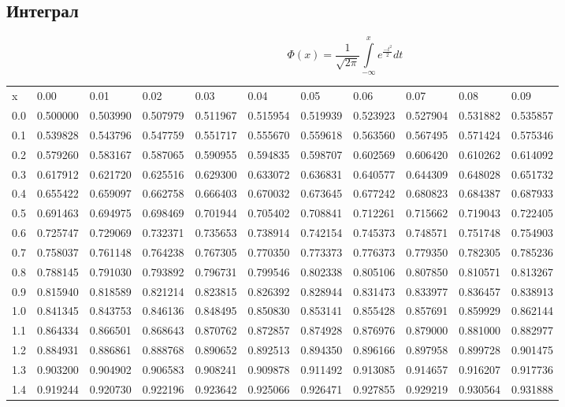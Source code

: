 \documentclass[12pt, a6paper]{extarticle}
\begin{document}
\subsection{Интеграл}
\begin{center}
$$ \Phi(x) = \frac{1}{\sqrt{2\pi}}\int\limits^{x}_{-\infty}{\displaystyle e^{\frac{-t^2}{2}}}dt$$
\footnotesize
\begin{tabular}{lllllllllll}
 x & 0.00&    0.01&    0.02&    0.03&    0.04&    0.05&    0.06&    0.07&    0.08&    0.09 \\
0.0& 0.500000&0.503990&0.507979&0.511967&0.515954&0.519939&0.523923&0.527904&0.531882&0.535857 \\
0.1& 0.539828&0.543796&0.547759&0.551717&0.555670&0.559618&0.563560&0.567495&0.571424&0.575346 \\
0.2& 0.579260&0.583167&0.587065&0.590955&0.594835&0.598707&0.602569&0.606420&0.610262&0.614092 \\
0.3& 0.617912&0.621720&0.625516&0.629300&0.633072&0.636831&0.640577&0.644309&0.648028&0.651732 \\
0.4& 0.655422&0.659097&0.662758&0.666403&0.670032&0.673645&0.677242&0.680823&0.684387&0.687933 \\
0.5& 0.691463&0.694975&0.698469&0.701944&0.705402&0.708841&0.712261&0.715662&0.719043&0.722405 \\
0.6& 0.725747&0.729069&0.732371&0.735653&0.738914&0.742154&0.745373&0.748571&0.751748&0.754903 \\
0.7& 0.758037&0.761148&0.764238&0.767305&0.770350&0.773373&0.776373&0.779350&0.782305&0.785236 \\
0.8& 0.788145&0.791030&0.793892&0.796731&0.799546&0.802338&0.805106&0.807850&0.810571&0.813267 \\
0.9& 0.815940&0.818589&0.821214&0.823815&0.826392&0.828944&0.831473&0.833977&0.836457&0.838913 \\
1.0& 0.841345&0.843753&0.846136&0.848495&0.850830&0.853141&0.855428&0.857691&0.859929&0.862144 \\
1.1& 0.864334&0.866501&0.868643&0.870762&0.872857&0.874928&0.876976&0.879000&0.881000&0.882977 \\
1.2& 0.884931&0.886861&0.888768&0.890652&0.892513&0.894350&0.896166&0.897958&0.899728&0.901475 \\
1.3& 0.903200&0.904902&0.906583&0.908241&0.909878&0.911492&0.913085&0.914657&0.916207&0.917736 \\
1.4& 0.919244&0.920730&0.922196&0.923642&0.925066&0.926471&0.927855&0.929219&0.930564&0.931888 \\

\end{tabular}
\end{center}
\end{document}
